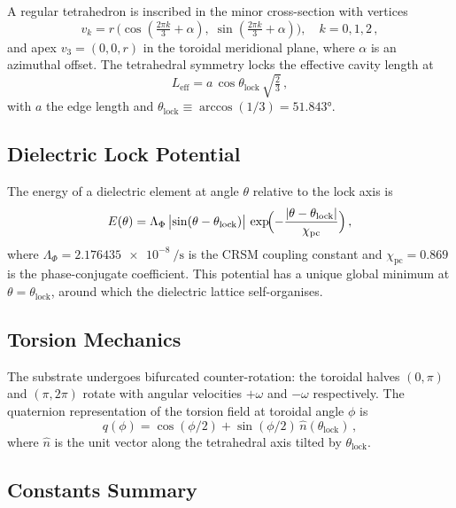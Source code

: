 \documentclass[aps,preprint,superscriptaddress,longbibliography]{revtex4-2}
\begin{document}
A regular tetrahedron is inscribed in the minor cross-section with
vertices
\begin{equation}
v_k = r\,\bigl(\cos(\tfrac{2\pi k}{3} + \alpha),\;
\sin(\tfrac{2\pi k}{3} + \alpha)\bigr),
\quad k = 0, 1, 2\,,
\label{eq:vertices}
\end{equation}
and apex $v_3 = (0, 0, r)$ in the toroidal meridional plane,
where $\alpha$ is an azimuthal offset.  The tetrahedral symmetry
locks the effective cavity length at
\begin{equation}
L_{\mathrm{eff}} = a\,\cos\theta_{\mathrm{lock}}\,
\sqrt{\tfrac{2}{3}}\,,
\label{eq:Leff}
\end{equation}
with $a$ the edge length and
$\theta_{\mathrm{lock}} \equiv \arccos(1/3) = \ang{51.843}$.

\subsection{Dielectric Lock Potential}

The energy of a dielectric element at angle $\theta$ relative to
the lock axis is
\begin{equation}
E(\theta) = \Lambda_\Phi\,
\bigl|\sin(\theta - \theta_{\mathrm{lock}})\bigr|\,
\exp\!\Bigl(-\frac{|\theta - \theta_{\mathrm{lock}}|}
{\chi_{\mathrm{pc}}}\Bigr)\,,
\label{eq:Etheta}
\end{equation}
where $\Lambda_\Phi = \SI{2.176435e-8}{\per\second}$ is the CRSM
coupling constant and $\chi_{\mathrm{pc}} = 0.869$ is the
phase-conjugate coefficient.  This potential has a unique global
minimum at $\theta = \theta_{\mathrm{lock}}$, around which the
dielectric lattice self-organises.

\subsection{Torsion Mechanics}

The substrate undergoes bifurcated counter-rotation: the toroidal
halves $(0, \pi)$ and $(\pi, 2\pi)$ rotate with angular velocities
$+\omega$ and $-\omega$ respectively.  The quaternion
representation of the torsion field at toroidal angle $\phi$ is
\begin{equation}
q(\phi) = \cos(\phi/2) +
\sin(\phi/2)\,\hat{n}(\theta_{\mathrm{lock}})\,,
\label{eq:quaternion}
\end{equation}
where $\hat{n}$ is the unit vector along the tetrahedral axis
tilted by $\theta_{\mathrm{lock}}$.

\subsection{Constants Summary}
\end{document}
